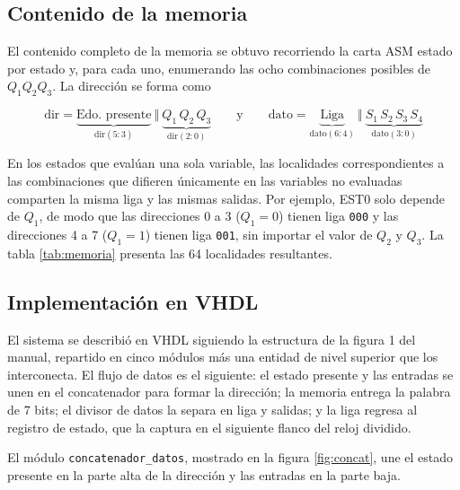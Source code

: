 \subsection{Contenido de la memoria}

El contenido completo de la memoria se obtuvo recorriendo la carta ASM estado por estado
y, para cada uno, enumerando las ocho combinaciones posibles de $Q_1Q_2Q_3$. La
dirección se forma como

\[
\text{dir} = \underbrace{\text{Edo. presente}}_{\text{dir}(5{:}3)} \ \Vert \
\underbrace{Q_1\,Q_2\,Q_3}_{\text{dir}(2{:}0)}
\qquad\text{y}\qquad
\text{dato} = \underbrace{\text{Liga}}_{\text{dato}(6{:}4)} \ \Vert \
\underbrace{S_1\,S_2\,S_3\,S_4}_{\text{dato}(3{:}0)}
\]

En los estados que evalúan una sola variable, las localidades correspondientes a las
combinaciones que difieren únicamente en las variables no evaluadas comparten la misma
liga y las mismas salidas. Por ejemplo, EST0 solo depende de $Q_1$, de modo que las
direcciones 0 a 3 ($Q_1 = 0$) tienen liga \texttt{000} y las direcciones 4 a 7
($Q_1 = 1$) tienen liga \texttt{001}, sin importar el valor de $Q_2$ y $Q_3$. La tabla
\ref{tab:memoria} presenta las 64 localidades resultantes.

\begin{table}[htbp]
  \centering
  \caption{Contenido de memoria obtenido por direccionamiento por trayectoria. Las
  direcciones 40 a 63 corresponden a los códigos de estado no utilizados.}
  \label{tab:memoria}
  \footnotesize

\end{table}

\subsection{Implementación en VHDL}

El sistema se describió en VHDL siguiendo la estructura de la figura 1 del manual,
repartido en cinco módulos más una entidad de nivel superior que los interconecta. El
flujo de datos es el siguiente: el estado presente y las entradas se unen en el
concatenador para formar la dirección; la memoria entrega la palabra de 7 bits; el
divisor de datos la separa en liga y salidas; y la liga regresa al registro de estado,
que la captura en el siguiente flanco del reloj dividido.

El módulo \texttt{concatenador\_datos}, mostrado en la figura \ref{fig:concat}, une el
estado presente en la parte alta de la dirección y las entradas en la parte baja.

